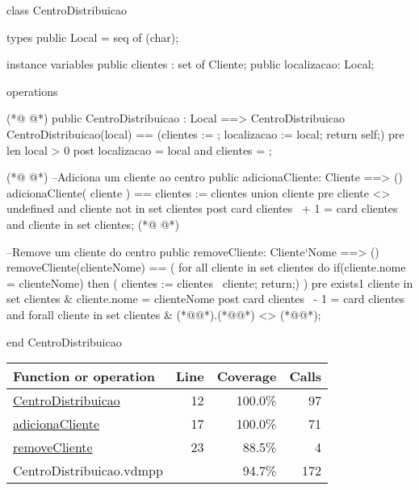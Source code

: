 \begin{vdmpp}[breaklines=true]
class CentroDistribuicao

types 
 public Local = seq of (char);

instance variables
 public clientes : set of Cliente;
  public localizacao: Local;
 
operations
  
(*@
\label{CentroDistribuicao:12}
@*)
  public  CentroDistribuicao : Local ==> CentroDistribuicao
  CentroDistribuicao(local) == (clientes := {}; localizacao := local; return self;)
  pre len local > 0
  post localizacao = local and clientes = {};
 
(*@
\label{adicionaCliente:17}
@*)
 --Adiciona um cliente ao centro
 public adicionaCliente: Cliente ==> () 
 adicionaCliente( cliente ) == 
   clientes := clientes union {cliente}
 pre cliente <> undefined and cliente not in set clientes
 post card clientes~ + 1 = card clientes and cliente in set clientes;  
(*@
\label{removeCliente:23}
@*)
 
 
 --Remove um cliente do centro
 public removeCliente: Cliente`Nome ==> () 
 removeCliente(clienteNome) == 
 (
  for all cliente in set clientes 
   do
    if(cliente.nome = clienteNome)
     then ( clientes := clientes \ {cliente}; return;) 
 ) 
 pre exists1 cliente in set clientes & cliente.nome = clienteNome
 post card clientes~ - 1 = card clientes and forall cliente in set clientes & (*@@*).(*@@*) <> (*@@*); 
 
end CentroDistribuicao
\end{vdmpp}
\bigskip
\begin{longtable}{|l|r|r|r|}
\hline
Function or operation & Line & Coverage & Calls \\
\hline
\hline
\hyperref[CentroDistribuicao:12]{CentroDistribuicao} & 12&100.0\% & 97 \\
\hline
\hyperref[adicionaCliente:17]{adicionaCliente} & 17&100.0\% & 71 \\
\hline
\hyperref[removeCliente:23]{removeCliente} & 23&88.5\% & 4 \\
\hline
\hline
CentroDistribuicao.vdmpp & & 94.7\% & 172 \\
\hline
\end{longtable}

